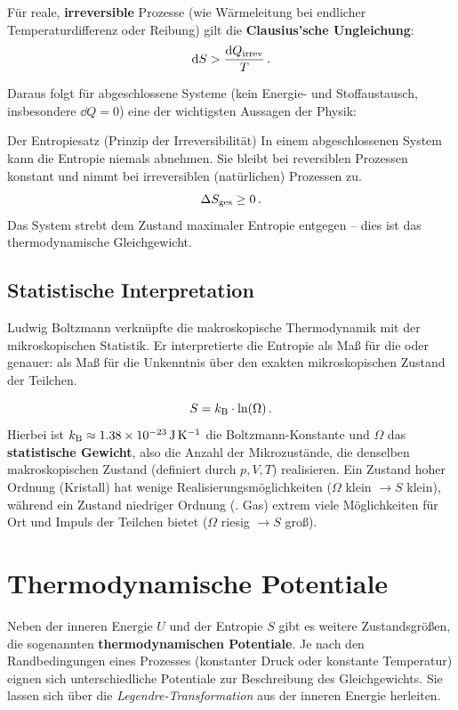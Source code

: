 Für reale, \textbf{irreversible} Prozesse (wie Wärmeleitung bei endlicher Temperaturdifferenz oder Reibung) gilt die \textbf{Clausius'sche Ungleichung}:
\begin{equation}
    \mathrm{d} S > \frac{\mathrm{d} Q_{\text{irrev}}}{T} \,.
\end{equation}

Daraus folgt für abgeschlossene Systeme (kein Energie- und Stoffaustausch, insbesondere $\dd Q=0$) eine der wichtigsten Aussagen der Physik:

\begin{rememberbox}{Der Entropiesatz (Prinzip der Irreversibilität)}
    In einem abgeschlossenen System kann die Entropie niemals abnehmen. Sie bleibt bei reversiblen Prozessen konstant und nimmt bei irreversiblen (natürlichen) Prozessen zu.
    \begin{equation}
        \Delta S_{\text{ges}} \geq 0 \,.
    \end{equation}
    Das System strebt dem Zustand maximaler Entropie entgegen -- dies ist das thermodynamische Gleichgewicht.
\end{rememberbox}

\subsection{Statistische Interpretation}
Ludwig Boltzmann verknüpfte die makroskopische Thermodynamik mit der mikroskopischen Statistik. Er interpretierte die Entropie als Maß für die  oder genauer: als Maß für die Unkenntnis über den exakten mikroskopischen Zustand der Teilchen.

\begin{equation}\label{eq: boltzmann_entropie}
    S = k_{\mathrm{B}} \cdot \ln(\Omega) \,.
\end{equation}
Hierbei ist $k_{\mathrm{B}} \approx \SI{1.38e-23}{\joule\per\kelvin}$ die Boltzmann-Konstante und $\Omega$ das \textbf{statistische Gewicht}, also die Anzahl der Mikrozustände, die denselben makroskopischen Zustand (definiert durch $p, V, T$) realisieren. Ein Zustand hoher Ordnung (\zB Kristall) hat wenige Realisierungsmöglichkeiten ($\Omega$ klein $\to S$ klein), während ein Zustand niedriger Ordnung (\zB. Gas) extrem viele Möglichkeiten für Ort und Impuls der Teilchen bietet ($\Omega$ riesig $\to S$ groß).

\section{Thermodynamische Potentiale}\label{sec: thermodynamische_potentiale}
Neben der inneren Energie $U$ und der Entropie $S$ gibt es weitere Zustandsgrößen, die sogenannten \textbf{thermodynamischen Potentiale}. Je nach den Randbedingungen eines Prozesses (\zB konstanter Druck oder konstante Temperatur) eignen sich unterschiedliche Potentiale zur Beschreibung des Gleichgewichts. Sie lassen sich über die \textit{Legendre-Transformation} aus der inneren Energie herleiten.

